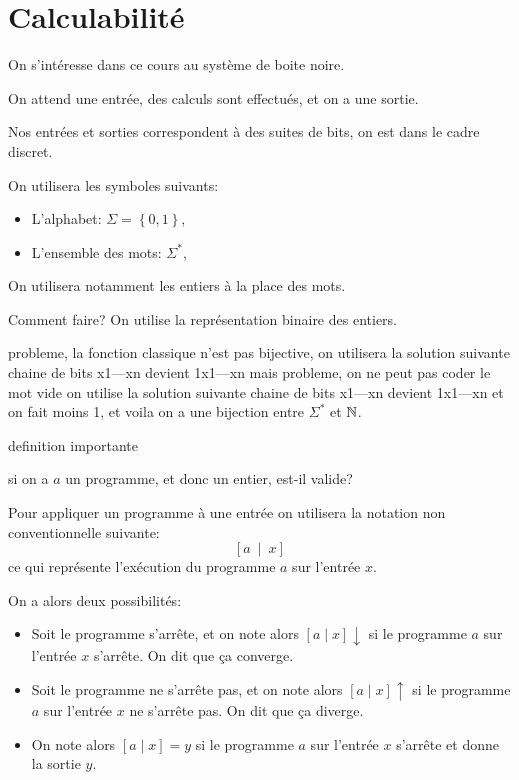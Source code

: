 \section{Calculabilité}\label{sec:secref}

On s'intéresse dans ce cours au système de boite noire.

On attend une entrée, des calculs sont effectués, et on a une sortie.

%
%
%

Nos entrées et sorties correspondent à des suites de bits,
on est dans le cadre discret.

On utilisera les symboles suivants:
\begin{itemize}
    \item L'alphabet: \(\Sigma = \left\{0,1\right\}\),
    \item L'ensemble des mots: \(\Sigma^*\),
\end{itemize}

On utilisera notamment les entiers à la place des mots.

Comment faire? 
On utilise la représentation binaire des entiers.

probleme, la fonction classique n'est pas bijective,
on utilisera la solution suivante
chaine de bits x1---xn
devient 
1x1---xn
mais probleme, on ne peut pas coder le mot vide
on utilise la solution suivante
chaine de bits x1---xn
devient
1x1---xn et on fait moins 1, et voila
on a une bijection entre \(\Sigma^*\) et \(\mathbb{N}\).


definition importante

si on a \(a\) un programme, et donc un entier, est-il valide?

Pour appliquer un programme à une entrée 
on utilisera la notation non conventionnelle suivante:
\begin{equation*}
    \left[a\ \mid\ x\right]
\end{equation*}
ce qui représente l'exécution du programme \(a\) sur l'entrée \(x\).

On a alors deux possibilités:
\begin{itemize}
    \item Soit le programme s'arrête, et on note alors
        \(\left[a\mid x\right]\downarrow\) si le programme \(a\) sur l'entrée \(x\)
        s'arrête. On dit que ça converge.
    \item Soit le programme ne s'arrête pas, et on note alors
        \(\left[a\mid x\right]\uparrow\) si le programme \(a\) sur l'entrée \(x\)
        ne s'arrête pas. On dit que ça diverge.
    \item On note alors
        \(\left[a\mid x\right] = y\) si le programme \(a\) sur l'entrée \(x\)
        s'arrête et donne la sortie \(y\).
\end{itemize}

